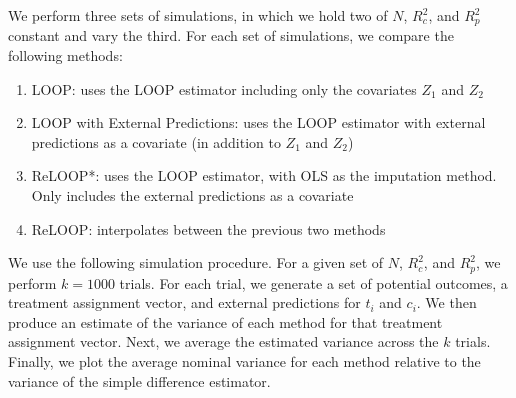 We perform three sets of simulations, in which we hold two of $N$, $R_c^2$, and $R^2_{p}$ constant and vary the third.  For each set of simulations, we compare the following methods:
\begin{enumerate}
	\item LOOP: uses the LOOP estimator including only the covariates $Z_1$ and $Z_2$
	\item LOOP with External Predictions: uses the LOOP estimator with external predictions as a covariate (in addition to $Z_1$ and $Z_2$)
	\item ReLOOP*: uses the LOOP estimator, with OLS as the imputation method. Only includes the external predictions as a covariate
	\item ReLOOP: interpolates between the previous two methods
\end{enumerate}
\noindent
We use the following simulation procedure. For a given set of $N$, $R_c^2$, and $R^2_{p}$, we perform $k = 1000$ trials. For each trial, we generate a set of potential outcomes, a treatment assignment vector, and external predictions for $t_i$ and $c_i$. We then produce an estimate of the variance of each method for that treatment assignment vector. Next, we average the estimated variance across the $k$ trials. Finally, we plot the average nominal variance for each method relative to the variance of the simple difference estimator.

